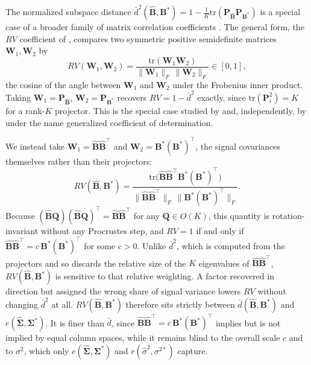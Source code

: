 The normalized subspace distance $\bar d^2(\hat{\mathbf B},\mathbf B^{*})=1-\frac1K\mathrm{tr}(\mathbf P_{\hat{\mathbf B}}\mathbf P_{\mathbf B^{*}})$ is a special case of a broader family of matrix correlation coefficients \citep{Ramsay1984}. The general form, the $RV$ coefficient of \citet{Escoufier1973,Robert1976}, compares two symmetric positive semidefinite matrices $\mathbf W_1,\mathbf W_2$ by
\[
RV(\mathbf W_1,\mathbf W_2)=\frac{\mathrm{tr}(\mathbf W_1\mathbf W_2)}{\|\mathbf W_1\|_F\,\|\mathbf W_2\|_F}\in[0,1],
\]
the cosine of the angle between $\mathbf W_1$ and $\mathbf W_2$ under the Frobenius inner product. Taking $\mathbf W_1=\mathbf P_{\hat{\mathbf B}}$, $\mathbf W_2=\mathbf P_{\mathbf B^{*}}$ recovers $RV=1-\bar d^2$ exactly, since $\mathrm{tr}(\mathbf P_i^2)=K$ for a rank-$K$ projector. This is the special case studied by \citet{Krzanowski1979} and, independently, by \citet{Yanai1974} under the name generalized coefficient of determination.

We instead take $\mathbf W_1=\hat{\mathbf B}\hat{\mathbf B}^\top$ and $\mathbf W_2=\mathbf B^{*}(\mathbf B^{*})^\top$, the signal covariances themselves rather than their projectors:
\begin{equation}
    RV(\hat{\mathbf B},\mathbf B^{*}) = \frac{\mathrm{tr}\big(\hat{\mathbf B}\hat{\mathbf B}^\top\mathbf B^{*}(\mathbf B^{*})^\top\big)}{\big\|\hat{\mathbf B}\hat{\mathbf B}^\top\big\|_F\,\big\|\mathbf B^{*}(\mathbf B^{*})^\top\big\|_F}.
    \label{eq:RV}
\end{equation}
Because $(\hat{\mathbf B}\mathbf Q)(\hat{\mathbf B}\mathbf Q)^\top=\hat{\mathbf B}\hat{\mathbf B}^\top$ for any $\mathbf Q\in O(K)$, this quantity is rotation-invariant without any Procrustes step, and $RV=1$ if and only if $\hat{\mathbf B}\hat{\mathbf B}^\top=c\,\mathbf B^{*}(\mathbf B^{*})^\top$ for some $c>0$. Unlike $\bar d^2$, which is computed from the projectors and so discards the relative size of the $K$ eigenvalues of $\hat{\mathbf B}\hat{\mathbf B}^\top$, $RV(\hat{\mathbf B},\mathbf B^{*})$ is sensitive to that relative weighting. A factor recovered in direction but assigned the wrong share of signal variance lowers $RV$ without changing $\bar d^2$ at all. $RV(\hat{\mathbf B},\mathbf B^{*})$ therefore sits strictly between $\bar d(\hat{\mathbf B},\mathbf B^{*})$ and $e(\hat{\bm\Sigma},\bm\Sigma^{*})$. It is finer than $\bar d$, since $\hat{\mathbf B}\hat{\mathbf B}^\top=c\,\mathbf B^{*}(\mathbf B^{*})^\top$ implies but is not implied by equal column spaces, while it remains blind to the overall scale $c$ and to $\sigma^2$, which only $e(\hat{\bm\Sigma},\bm\Sigma^{*})$ and $r(\hat\sigma^2,\sigma^{2*})$ capture.

